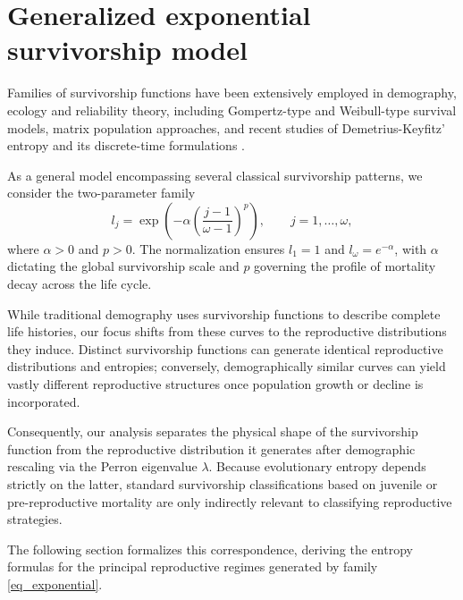 \documentclass[10pt,a4paper]{amsart}
\theoremstyle{definition}
\theoremstyle{remark}
\numberwithin{equation}{section}
\begin{document}
\section{Generalized exponential survivorship model}\label{sec_exp_model}

Families of survivorship functions have been extensively employed in
demography, ecology and reliability theory, including Gompertz-type
and Weibull-type survival models, matrix population approaches, and
recent studies of Demetrius-Keyfitz' entropy and its discrete-time
formulations
\cite{Bernard2024,Gompertz1825,Weibull1951,Caswell,VAU,Baudisch2008,
	Jones2014,Fernandez2015,Colchero2016,deVries2023,Giaimo2024}.

As a general model encompassing several classical survivorship
patterns, we consider the two-parameter family
\begin{equation}
\label{eq_exponential}
l_j=
\exp\left(
-\alpha
\left(
\frac{j-1}{\omega-1}
\right)^p
\right),
\qquad
j=1,\dots,\omega,
\end{equation}
where $\alpha>0$ and $p>0$. The normalization ensures $l_1=1$ and $l_\omega=e^{-\alpha}$, with $\alpha$ dictating the global survivorship scale and $p$ governing the profile of mortality decay across the life cycle.

While traditional demography uses survivorship functions to describe complete life histories, our focus shifts from these curves to the reproductive distributions they induce. Distinct survivorship functions can generate identical reproductive distributions and entropies; conversely, demographically similar curves can yield vastly different reproductive structures once population growth or decline is incorporated. 

Consequently, our analysis separates the physical shape of the survivorship function from the reproductive distribution it generates after demographic rescaling via the Perron eigenvalue $\lambda$. Because evolutionary entropy depends strictly on the latter, standard survivorship classifications based on juvenile or pre-reproductive mortality are only indirectly relevant to classifying reproductive strategies.

The following section formalizes this correspondence, deriving the entropy formulas for the principal reproductive regimes generated by family \eqref{eq_exponential}.
\end{document}
